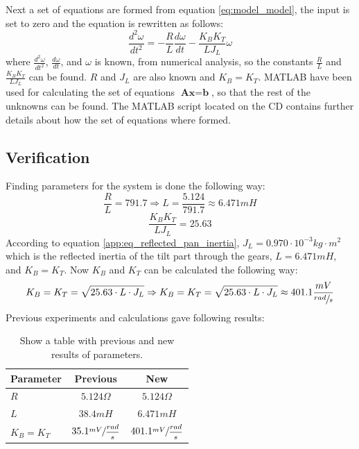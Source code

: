 Next a set of equations are formed from equation \ref{eq:model_model}, the input is set to zero and the equation is rewritten as follows:
\begin{equation}
	\frac{d^{2}\omega}{dt^{2}} = - \frac{R}{L} \frac{d\omega}{dt} - \frac{K_B K_T}{L J_L} \omega
\end{equation}
where $\frac{d^{2}\omega}{dt^{2}}$, $\frac{d\omega}{dt}$, and $\omega$ is known, from numerical analysis, so the constants $\frac{R}{L}$ and $\frac{K_B K_T}{L J_L}$ can be found. $R$ and $J_L$ are also known and $K_B = K_T$. MATLAB have been used for calculating the set of equations $\textbf{Ax} = \textbf{b}$, so that the rest of the unknowns can be found. The MATLAB script located on the CD contains further details about how the set of equations where formed.

\subsection{Verification}
Finding parameters for the system is done the following way:
\begin{equation}
	\frac{R}{L} = 791.7 \Rightarrow L = \frac{5.124}{791.7} \approx 6.471mH
\end{equation}
\begin{equation}
	\frac{K_B K_T}{L J_L} = 25.63\label{eq:constants}
\end{equation}
According to equation \ref{app:eq_reflected_pan_inertia}, $J_L = 0.970 \cdot 10^{-3} kg \cdot m^{2}$ which is the reflected inertia of the tilt part through the gears, $L = 6.471mH$, and $K_B = K_T$. Now $K_B$ and $K_T$ can be calculated the following way:
\begin{equation}
	K_B = K_T = \sqrt{25.63 \cdot L \cdot J_L} \Rightarrow K_B = K_T = \sqrt{25.63 \cdot L \cdot J_L} \approx 401.1 \frac{mV}{\sfrac{rad}{s}}
\end{equation}
Previous experiments\cite{DCMOTOR} and calculations gave following results:
\begin{table}[htb]				
	\begin{center}
	\begin{tabular}{l|c|c}			
Parameter & Previous & New \\			
	\hline												
$R$ & $5.124\Omega$ & $5.124\Omega$\\
$L$ & $38.4mH$ & $6.471mH$\\
$K_B = K_T$ & $35.1\sfrac{mV}{\dfrac{rad}{s}}$ & $401.1\sfrac{mV}{\dfrac{rad}{s}}$\\
	\end{tabular}
	\end{center}
	\caption{Show a table with previous and new results of parameters.}				
	\label{tab:parameters}			
\end{table}

